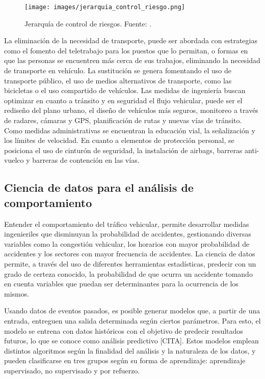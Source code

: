 \documentclass[12pt]{article}
\begin{document}
\begin{figure}[h]
    \centering
    \texttt{[image: images/jerarquia\_control\_riesgo.png]}
    \caption{Jerarquía de control de riesgos. Fuente: \textcite{niosh2024}.}
    \label{fig:jerarquia_riesgos}
\end{figure}

La eliminación de la necesidad de transporte, puede ser abordada con estrategias como el fomento del teletrabajo para los puestos que lo permitan, o formas en que las personas se encuentren más cerca de sus trabajos, eliminando la necesidad de transporte en vehículo. La sustitución se genera fomentando el uso de transporte público, el uso de medios alternativos de transporte, como las bicicletas o el uso compartido de vehículos. Las medidas de ingeniería buscan optimizar en cuanto a tránsito y en seguridad el flujo vehicular, puede ser el rediseño del plano urbano, el diseño de vehículos más seguros, monitoreo a través de radares, cámaras y GPS, planificación de rutas y nuevas vías de tránsito. Como medidas administrativas se encuentran la educación vial, la señalización y los límites de velocidad. En cuanto a elementos de protección personal, se posiciona el uso de cinturón de seguridad, la instalación de airbags, barreras anti-vuelco y barreras de contención en las vías.

\subsection{Ciencia de datos para el análisis de comportamiento}

Entender el comportamiento del tráfico vehicular, permite desarrollar medidas ingenieriles que disminuyan la probabilidad de accidentes, gestionando diversas variables como la congestión vehicular, los horarios con mayor probabilidad de accidentes y los sectores con mayor frecuencia de accidentes. La ciencia de datos permite, a través del uso de diferentes herramientas estadísticas, predecir con un grado de certeza conocido, la probabilidad de que ocurra un accidente tomando en cuenta variables que puedan ser determinantes para la ocurrencia de los mismos.

Usando datos de eventos pasados, es posible generar modelos que, a partir de una entrada, entreguen una salida determinada según ciertos parámetros. Para esto, el modelo se entrena con datos históricos con el objetivo de predecir resultados futuros, lo que se conoce como análisis predictivo [CITA]. Estos modelos emplean distintos algoritmos según la finalidad del análisis y la naturaleza de los datos, y pueden clasificarse en tres grupos según su forma de aprendizaje: aprendizaje supervisado, no supervisado y por refuerzo.
\end{document}
